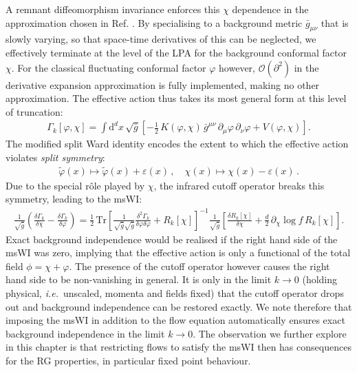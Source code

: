 \documentclass[11pt]{book}
\newcommand\ie{\textit{i.e.}\ }
\newcommand{\eps}{\varepsilon}
\newcommand{\vp}{\varphi}
\newcommand{\dclnf}{\,\partial_\chi\! \log\! f \,}
\numberwithin{equation}{chapter}
\begin{document}
A remnant diffeomorphism invariance enforces this $\chi$ dependence in the approximation chosen in
Ref. \cite{Dietz:2015owa}.
By specialising to a background metric ${\bar g}_{\mu\nu}$ that is slowly varying,
so that space-time derivatives of this can be neglected, we effectively terminate at the level of
the LPA for the background conformal factor $\chi$.
For the classical fluctuating conformal factor $\vp$ however,
$\mathcal{O}(\partial^2)$ in the derivative expansion approximation is fully implemented,
making no other approximation.
The effective action thus takes its most general form at this level of truncation:
\begin{align}
  \Gamma_k[\varphi, \chi] = \int \mathrm d^dx \, \sqrt{\bar g}
  \left[
    - \frac{1}{2} \, K(\varphi,\chi) \, \bar g^{\mu\nu} \, \partial_{\mu}\varphi \, \partial_{\nu}\varphi
    + V(\varphi,\chi)
  \right] .
  \label{trunc}
\end{align}
The modified split Ward identity encodes the extent to which the effective action violates
\textit{split symmetry}:
\begin{align}
  \tilde \vp(x) \mapsto \tilde \vp(x) + \eps(x) \,, \quad \chi(x) \mapsto \chi(x) -\eps(x)\,.
  \label{equ:split-symmetry}
\end{align}
Due to the special r\^ole played by $\chi$, the infrared cutoff operator breaks this symmetry,
leading to the msWI:
\begin{align}
  \frac{1}{\sqrt{\bar g}}
  \left(
    \frac{\delta\Gamma_k}{\delta \chi} - \frac{\delta \Gamma_k}{\delta \vp}
  \right)
  = \frac{1}{2} \, \mathrm{Tr}
  \left[
    \frac{1}{\sqrt{\bar g}\sqrt{\bar g}}\frac{\delta^2\Gamma_k}
    {\delta \vp \delta \vp}+ R_k[\chi]
  \right]^{-1}
  \frac{1}{\sqrt{\bar g}}
  \left[
    \frac{\delta R_k[\chi] }{\delta \chi}+\frac{d}{2} \dclnf R_k[\chi]
  \right] .
  \label{equ:sWiGamma}
\end{align}
Exact background independence would be realised if the right hand side of the msWI was zero,
implying that the effective action is only a functional of the total field $\phi = \chi + \vp$.
The presence of the cutoff operator however causes the right hand side to be non-vanishing in general.
It is only in the limit $k\rightarrow0$ (holding physical, \ie unscaled,
momenta and fields fixed) that the cutoff operator drops out and background independence can be
restored exactly. We note therefore that imposing the msWI in addition to the flow equation
automatically ensures exact background independence in the limit $k\rightarrow0$.
The observation we further explore in this chapter is that restricting flows to
satisfy the msWI then has consequences for the RG properties,
in particular fixed point behaviour.
\end{document}
